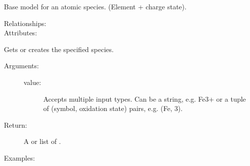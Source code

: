 \documentclass[letterpaper,10pt,english]{sphinxmanual}
\begin{document}
\begin{fulllineitems}
\label{models:qmpy.Species}
Base model for an atomic species. (Element + charge state).
\begin{description}
\item[{Relationships:}] \leavevmode
{}

\item[{Attributes:}] \leavevmode
{}

\end{description}

\begin{fulllineitems}
\label{models:qmpy.Species.get}
Gets or creates the specified species.
\begin{description}
\item[{Arguments:}] \leavevmode\begin{description}
\item[{value: }] \leavevmode
Accepts multiple input types. Can be a string, e.g. Fe3+
or a tuple of (symbol, oxidation state) pairs, e.g. (Fe, 3).

\end{description}

\item[{Return:}] \leavevmode
A {\hyperref[models:qmpy.Species]{}} or list of {\hyperref[models:qmpy.Species]{}}.

\end{description}

Examples:


\end{fulllineitems}
\end{fulllineitems}
\end{document}
